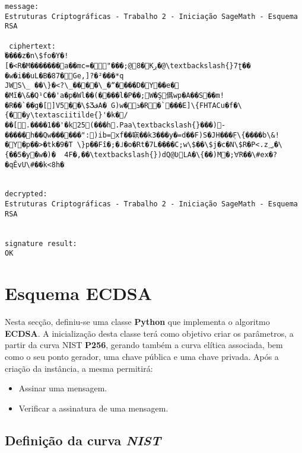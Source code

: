 \documentclass[11pt]{article}
\providecommand{\tightlist}{%
      \setlength{\itemsep}{0pt}\setlength{\parskip}{0pt}}
\begin{document}
    \begin{Verbatim}[commandchars=\\\{\}]
message:
Estruturas Criptográficas - Trabalho 2 - Iniciação SageMath - Esquema RSA

 ciphertext:
͋����z�n\$fo�Y�![�<R�M�������a��mc=�"���;@8�Kڔ�@\textbackslash{}7ʈ��
�w�i��uL�B�87�Ge,]?�²���*q
JW򿈼S\_ ��\}�<?\_����\_�ˮ����D�Y��e�
�Mĭ�\&�Q¹C��'a�p�Wl��(����l�P��;W�Ş儰wp�A��S��m!�R��`��g�[]V5��\$ӠفA� G)w�ܪ�R�`���E]\{FHTACu�f�\{��y\textasciitilde{}'�k�/��[.����1��'�k25(���h.Paa\textbackslash{}���)-�����h��Qw������":)ib=xf��㝪��k3���y�=d��F)S�JH���F̜\{����b\&!�Y�p��>�tk�9�T \}p��Fî�;�˩�o�Rt�7L����C;w\$��\$j�c�N\$R�P<.z؃�\{��5�y�w�)�	4F�,��\textbackslash{})dQ@ƲLA�\{��)M�;ꓯR��\#ex�?�qÊvU\#��k<8h�


decrypted:
Estruturas Criptográficas - Trabalho 2 - Iniciação SageMath - Esquema RSA


signature result:
OK

    \end{Verbatim}

    \section{Esquema ECDSA}\label{esquema-ecdsa}

    Nesta secção, definiu-se uma classe \textbf{Python} que implementa o
algoritmo \textbf{ECDSA}. A inicialização desta classe terá como
objetivo criar os parâmetros, a partir da curva NIST \textbf{P256},
gerando também a curva elítica associada, bem como o seu ponto gerador,
uma chave pública e uma chave privada. Após a criação da instância, a
mesma permitirá:

\begin{itemize}
\tightlist
\item
  Assinar uma mensagem.
\item
  Verificar a assinatura de uma mensagem.
\end{itemize}

    \subsection{\texorpdfstring{Definição da curva
\emph{NIST}}{Definição da curva NIST}}\label{definiuxe7uxe3o-da-curva-nist}
\end{document}
